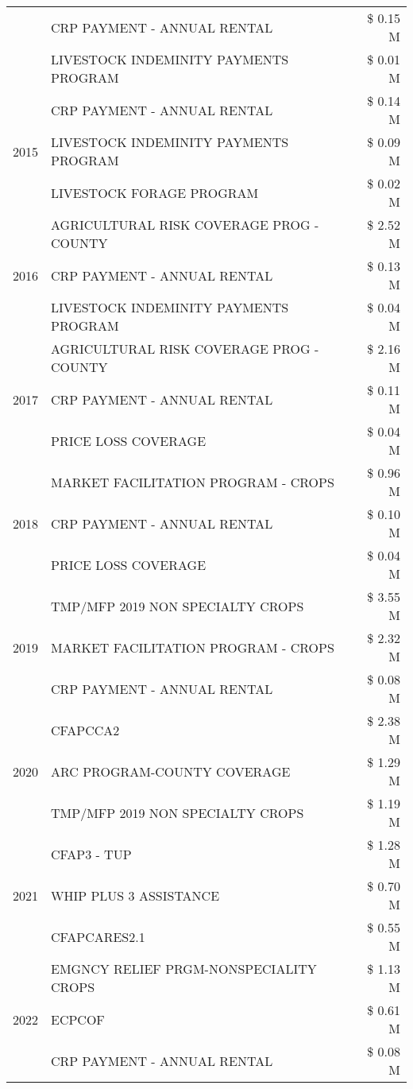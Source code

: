 \begin{tabular}{llr}
 & CRP PAYMENT - ANNUAL RENTAL & \$ 0.15 M \\
 & LIVESTOCK INDEMINITY PAYMENTS PROGRAM & \$ 0.01 M \\
\cline{1-3}
\multirow[t]{3}{*}{2015} & CRP PAYMENT - ANNUAL RENTAL & \$ 0.14 M \\
 & LIVESTOCK INDEMINITY PAYMENTS PROGRAM & \$ 0.09 M \\
 & LIVESTOCK FORAGE PROGRAM & \$ 0.02 M \\
\cline{1-3}
\multirow[t]{3}{*}{2016} & AGRICULTURAL RISK COVERAGE PROG - COUNTY & \$ 2.52 M \\
 & CRP PAYMENT - ANNUAL RENTAL & \$ 0.13 M \\
 & LIVESTOCK INDEMINITY PAYMENTS PROGRAM & \$ 0.04 M \\
\cline{1-3}
\multirow[t]{3}{*}{2017} & AGRICULTURAL RISK COVERAGE PROG - COUNTY & \$ 2.16 M \\
 & CRP PAYMENT - ANNUAL RENTAL & \$ 0.11 M \\
 & PRICE LOSS COVERAGE & \$ 0.04 M \\
\cline{1-3}
\multirow[t]{3}{*}{2018} & MARKET FACILITATION PROGRAM - CROPS & \$ 0.96 M \\
 & CRP PAYMENT - ANNUAL RENTAL & \$ 0.10 M \\
 & PRICE LOSS COVERAGE & \$ 0.04 M \\
\cline{1-3}
\multirow[t]{3}{*}{2019} & TMP/MFP 2019 NON SPECIALTY CROPS & \$ 3.55 M \\
 & MARKET FACILITATION PROGRAM - CROPS & \$ 2.32 M \\
 & CRP PAYMENT - ANNUAL RENTAL & \$ 0.08 M \\
\cline{1-3}
\multirow[t]{3}{*}{2020} & CFAPCCA2 & \$ 2.38 M \\
 & ARC PROGRAM-COUNTY COVERAGE & \$ 1.29 M \\
 & TMP/MFP 2019 NON SPECIALTY CROPS & \$ 1.19 M \\
\cline{1-3}
\multirow[t]{3}{*}{2021} & CFAP3 - TUP & \$ 1.28 M \\
 & WHIP PLUS 3 ASSISTANCE & \$ 0.70 M \\
 & CFAPCARES2.1 & \$ 0.55 M \\
\cline{1-3}
\multirow[t]{3}{*}{2022} & EMGNCY RELIEF PRGM-NONSPECIALITY CROPS & \$ 1.13 M \\
 & ECPCOF & \$ 0.61 M \\
 & CRP PAYMENT - ANNUAL RENTAL & \$ 0.08 M \\
\cline{1-3}
\bottomrule
\end{tabular}
